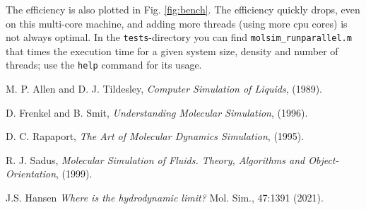 \documentclass[11pt]{article}
\begin{document}
The efficiency is also plotted in Fig. \ref{fig:bench}. The efficiency quickly
drops, even on this multi-core machine, and adding more threads (using more cpu
cores) is not always optimal. In the \verb!tests!-directory you can find
\verb!molsim_runparallel.m! that times the execution time for a given system
size, density and number of threads; use the \verb!help! command for its usage.

\bigskip

\noindent

\begin{thebibliography}{9}

  M. P. Allen and D. J. Tildesley, \emph{Computer Simulation of Liquids}, (1989). 

  D. Frenkel and B. Smit, \emph{Understanding Molecular Simulation}, (1996).

 D. C. Rapaport, \emph{The Art of Molecular Dynamics Simulation}, (1995).

  R. J. Sadus, \emph{Molecular Simulation of Fluids. Theory, Algorithms and
    Object-Orientation}, (1999).

  J.S. Hansen \emph{Where is the hydrodynamic limit?} Mol. Sim., 47:1391 (2021).
\end{thebibliography}

\appendix

\clearpage
\end{document}
